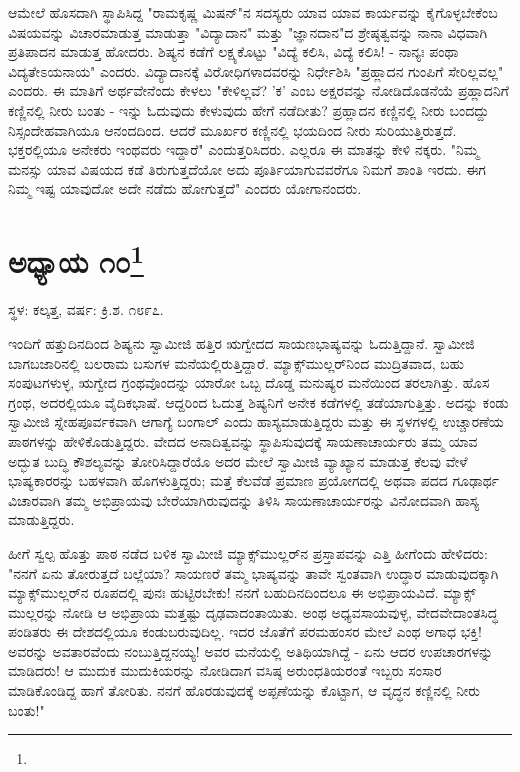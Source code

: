 ಆಮೇಲೆ ಹೊಸದಾಗಿ ಸ್ಥಾಪಿಸಿದ್ದ "ರಾಮಕೃಷ್ಣ ಮಿಷನ್"ನ ಸದಸ್ಯರು ಯಾವ ಯಾವ ಕಾರ್ಯವನ್ನು ಕೈಗೊಳ್ಳಬೇಕೆಂಬ ವಿಷಯವನ್ನು ವಿಚಾರಮಾಡುತ್ತ ಮಾಡುತ್ತಾ "ವಿದ್ಯಾದಾನ" ಮತ್ತು "ಜ್ಞಾನದಾನ"ದ ಶ್ರೇಷ್ಠತ್ವವನ್ನು ನಾನಾ ವಿಧವಾಗಿ ಪ್ರತಿಪಾದನ ಮಾಡುತ್ತ ಹೋದರು. ಶಿಷ್ಯನ ಕಡೆಗೆ ಲಕ್ಷ್ಯಕೊಟ್ಟು "ವಿದ್ಯೆ ಕಲಿಸಿ, ವಿದ್ಯೆ ಕಲಿಸಿ! - ನಾನ್ಯಃ ಪಂಥಾ ವಿದ್ಯತೇಽಯನಾಯ" ಎಂದರು. ವಿದ್ಯಾದಾನಕ್ಕೆ ವಿರೋಧಿಗಳಾದವರನ್ನು ನಿರ್ಧೇಶಿಸಿ "ಪ್ರಹ್ಲಾದನ ಗುಂಪಿಗೆ ಸೇರಿಲ್ಲವಲ್ಲ" ಎಂದರು. ಈ ಮಾತಿಗೆ ಅರ್ಥವೇನೆಂದು ಕೇಳಲು "ಕೇಳಿಲ್ಲವೆ? 'ಕ' ಎಂಬ ಅಕ್ಷರವನ್ನು ನೋಡಿದೊಡನೆಯೆ ಪ್ರಹ್ಲಾದನಿಗೆ ಕಣ್ಣಿನಲ್ಲಿ ನೀರು ಬಂತು - ಇನ್ನು ಓದುವುದು ಕೇಳುವುದು ಹೇಗೆ ನಡೆದೀತು? ಪ್ರಹ್ಲಾದನ ಕಣ್ಣಿನಲ್ಲಿ ನೀರು ಬಂದದ್ದು ನಿಸ್ಸಂದೇಹವಾಗಿಯೂ ಆನಂದದಿಂದ. ಆದರೆ ಮೂರ್ಖರ ಕಣ್ಣಿನಲ್ಲಿ ಭಯದಿಂದ ನೀರು ಸುರಿಯುತ್ತಿರುತ್ತದೆ. ಭಕ್ತರಲ್ಲಿಯೂ ಅನೇಕರು ಇಂಥವರು ಇದ್ದಾರೆ" ಎಂದುತ್ತರಿಸಿದರು. ಎಲ್ಲರೂ ಈ ಮಾತನ್ನು ಕೇಳಿ ನಕ್ಕರು. "ನಿಮ್ಮ ಮನಸ್ಸು ಯಾವ ವಿಷಯದ ಕಡೆ ತಿರುಗುತ್ತದೆಯೋ ಅದು ಪೂರ್ತಿಯಾಗುವವರೆಗೂ ನಿಮಗೆ ಶಾಂತಿ ಇರದು. ಈಗ ನಿಮ್ಮ ಇಷ್ಟ ಯಾವುದೋ ಅದೇ ನಡೆದು ಹೋಗುತ್ತದೆ" ಎಂದರು ಯೋಗಾನಂದರು.

\newpage

\chapter[ಅಧ್ಯಾಯ ೧೦]{ಅಧ್ಯಾಯ ೧೦\protect\footnote{}}

\begin{center}
ಸ್ಥಳ: ಕಲ್ಕತ್ತ, ವರ್ಷ: ಕ್ರಿ.ಶ. ೧೮೯೭.
\end{center}

ಇಂದಿಗೆ ಹತ್ತುದಿನದಿಂದ ಶಿಷ್ಯನು ಸ್ವಾಮೀಜಿ ಹತ್ತಿರ ಋಗ್ವೇದದ ಸಾಯಣಭಾಷ್ಯವನ್ನು ಓದುತ್ತಿದ್ದಾನೆ. ಸ್ವಾಮೀಜಿ ಬಾಗಬಜಾರಿನಲ್ಲಿ ಬಲರಾಮ ಬಸುಗಳ ಮನೆಯಲ್ಲಿರುತ್ತಿದ್ದಾರೆ. ಮ್ಯಾಕ್ಸ್‌ಮುಲ್ಲರ್‌ನಿಂದ ಮುದ್ರಿತವಾದ, ಬಹು ಸಂಪುಟಗಳುಳ್ಳ, ಋಗ್ವೇದ ಗ್ರಂಥವೊಂದನ್ನು ಯಾರೋ ಒಬ್ಬ ದೊಡ್ಡ ಮನುಷ್ಯರ ಮನೆಯಿಂದ ತರಲಾಗಿತ್ತು. ಹೊಸ ಗ್ರಂಥ, ಅದರಲ್ಲಿಯೂ ವೈದಿಕಭಾಷೆ. ಆದ್ದರಿಂದ ಓದುತ್ತ ಶಿಷ್ಯನಿಗೆ ಅನೇಕ ಕಡೆಗಳಲ್ಲಿ ತಡೆಯಾಗುತ್ತಿತ್ತು. ಅದನ್ನು ಕಂಡು ಸ್ವಾಮೀಜಿ ಸ್ನೇಹಪೂರ್ವಕವಾಗಿ ಆಗಾಗ್ಯೆ ಬಂಗಾಲ್ ಎಂದು ಹಾಸ್ಯಮಾಡುತ್ತಿದ್ದರು ಮತ್ತು ಈ ಸ್ಥಳಗಳಲ್ಲಿ ಉಚ್ಚಾರಣೆಯ ಪಾಠಗಳನ್ನು ಹೇಳಿಕೊಡುತ್ತಿದ್ದರು. ವೇದದ ಅನಾದಿತ್ವವನ್ನು ಸ್ಥಾಪಿಸುವುದಕ್ಕೆ ಸಾಯಣಾಚಾರ್ಯರು ತಮ್ಮ ಯಾವ ಅದ್ಭುತ ಬುದ್ಧಿ ಕೌಶಲ್ಯವನ್ನು ತೋರಿಸಿದ್ದಾರೆಯೊ ಅದರ ಮೇಲೆ ಸ್ವಾಮೀಜಿ ವ್ಯಾಖ್ಯಾನ ಮಾಡುತ್ತ ಕೆಲವು ವೇಳೆ ಭಾಷ್ಯಕಾರರನ್ನು ಬಹಳವಾಗಿ ಹೊಗಳುತ್ತಿದ್ದರು; ಮತ್ತೆ ಕೆಲವೆಡೆ ಪ್ರಮಾಣ ಪ್ರಯೋಗದಲ್ಲಿ ಅಥವಾ ಪದದ ಗೂಢಾರ್ಥ ವಿಚಾರವಾಗಿ ತಮ್ಮ ಅಭಿಪ್ರಾಯವು ಬೇರೆಯಾಗಿರುವುದನ್ನು ತಿಳಿಸಿ ಸಾಯಣಾಚಾರ್ಯರನ್ನು ವಿನೋದವಾಗಿ ಹಾಸ್ಯ ಮಾಡುತ್ತಿದ್ದರು.

ಹೀಗೆ ಸ್ವಲ್ಪ ಹೊತ್ತು ಪಾಠ ನಡೆದ ಬಳಿಕ ಸ್ವಾಮೀಜಿ ಮ್ಯಾಕ್ಸ್‌ಮುಲ್ಲರ್‌ನ ಪ್ರಸ್ತಾಪವನ್ನು ಎತ್ತಿ ಹೀಗೆಂದು ಹೇಳಿದರು: "ನನಗೆ ಏನು ತೋರುತ್ತದೆ ಬಲ್ಲೆಯಾ? ಸಾಯಣರೆ ತಮ್ಮ ಭಾಷ್ಯವನ್ನು ತಾವೇ ಸ್ವಂತವಾಗಿ ಉದ್ಧಾರ ಮಾಡುವುದಕ್ಕಾಗಿ ಮ್ಯಾಕ್ಸ್‌ಮುಲ್ಲರ್‌ನ ರೂಪದಲ್ಲಿ ಪುನಃ ಹುಟ್ಟಿರಬೇಕು! ನನಗೆ ಬಹುದಿನದಿಂದಲೂ ಈ ಅಭಿಪ್ರಾಯವಿದೆ. ಮ್ಯಾಕ್ಸ್ ಮುಲ್ಲರನ್ನು ನೋಡಿ ಆ ಅಭಿಪ್ರಾಯ ಮತ್ತಷ್ಟು ದೃಢವಾದಂತಾಯಿತು. ಅಂಥ ಅಧ್ಯವಸಾಯವುಳ್ಳ, ವೇದವೇದಾಂತಸಿದ್ಧ ಪಂಡಿತರು ಈ ದೇಶದಲ್ಲಿಯೂ ಕಂಡುಬರುವುದಿಲ್ಲ. ಇದರ ಜೊತೆಗೆ ಪರಮಹಂಸರ ಮೇಲೆ ಎಂಥ ಅಗಾಧ ಭಕ್ತಿ! ಅವರನ್ನು ಅವತಾರವೆಂದು ನಂಬುತ್ತಿದ್ದನಯ್ಯ! ಅವರ ಮನೆಯಲ್ಲಿ ಅತಿಥಿಯಾಗಿದ್ದೆ - ಏನು ಆದರ ಉಪಚಾರಗಳನ್ನು ಮಾಡಿದರು! ಆ ಮುದುಕ ಮುದುಕಿಯರನ್ನು ನೋಡಿದಾಗ ವಸಿಷ್ಠ ಅರುಂಧತಿಯರಂತೆ ಇಬ್ಬರು ಸಂಸಾರ ಮಾಡಿಕೊಂಡಿದ್ದ ಹಾಗೆ ತೋರಿತು. ನನಗೆ ಹೊರಡುವುದಕ್ಕೆ ಅಪ್ಪಣೆಯನ್ನು ಕೊಟ್ಟಾಗ, ಆ ವೃದ್ಧನ ಕಣ್ಣಿನಲ್ಲಿ ನೀರು ಬಂತು!"

